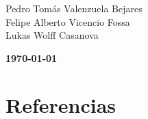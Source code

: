 \documentclass{article}  %
\begin{document}
\begin{titlepage}
\begin{flushright}
{    Pedro Tomás Valenzuela Bejares\\
    Felipe Alberto Vicencio Fossa\\
    Lukas Wolff Casanova\\
}
\end{flushright}
\vspace{1cm}
{\large \textbf{\today}}\\[2cm] %
\end{titlepage}

\newpage
\thispagestyle{empty} %

\newpage
\thispagestyle{empty} %
\tableofcontents
\thispagestyle{plain} %
\thispagestyle{empty} %

\thispagestyle{empty}
\listoffigures 
\thispagestyle{plain} %
\thispagestyle{empty}
\newpage
\setcounter{page}{1}







\renewcommand{\refname}{}  %
\renewcommand{\bibname}{}  %
\newpage
\part{Referencias}  %
\vspace{-1cm}
\end{document}
